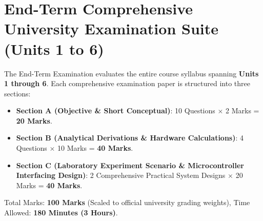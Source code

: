 \documentclass[a4paper,11pt,oneside,openany]{book}
\begin{document}
\newpage



\chapter{End-Term Comprehensive University Examination Suite (Units 1 to 6)}
\label{chap:endterm}
\noindent
The End-Term Examination evaluates the entire course syllabus spanning \textbf{Units 1 through 6}. Each comprehensive examination paper is structured into three sections:
\begin{itemize}
    \item \textbf{Section A (Objective \& Short Conceptual)}: 10 Questions $\times$ 2 Marks = \textbf{20 Marks}.
    \item \textbf{Section B (Analytical Derivations \& Hardware Calculations)}: 4 Questions $\times$ 10 Marks = \textbf{40 Marks}.
    \item \textbf{Section C (Laboratory Experiment Scenario \& Microcontroller Interfacing Design)}: 2 Comprehensive Practical System Designs $\times$ 20 Marks = \textbf{40 Marks}.
\end{itemize}
Total Marks: \textbf{100 Marks} (Scaled to official university grading weights), Time Allowed: \textbf{180 Minutes (3 Hours)}.

\newpage


\end{document}
